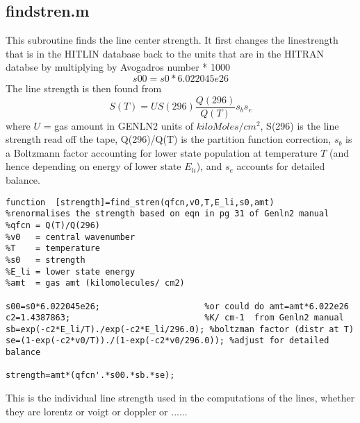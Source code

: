 \documentclass[11pt]{article}
\begin{document}
\subsection{findstren.m}

This subroutine finds the line center strength. It first changes the 
linestrength that is in the HITLIN database back to the units that are
in the HITRAN databse by multiplying by Avogadros number * 1000 
\begin{displaymath}
  s00=s0*6.022045e26
\end{displaymath}
The line strength is then found from 
\begin{displaymath}
S(T) = U S(296) \frac{Q(296)}{Q(T)} s_{b} s_{e}
\end{displaymath}
where $U$ = gas amount in GENLN2 units of $kiloMoles/cm^{2}$, S(296) is the 
line strength read off the tape, Q(296)/Q(T) is the partition function 
correction, $s_{b}$ is a Boltzmann factor accounting for lower state 
population at 
temperature $T$ (and hence depending on energy of lower state $E_{li}$), and
$s_{e}$ accounts for detailed balance.

\begin{verbatim}
function  [strength]=find_stren(qfcn,v0,T,E_li,s0,amt)
%renormalises the strength based on eqn in pg 31 of Genln2 manual
%qfcn = Q(T)/Q(296)
%v0   = central wavenumber
%T    = temperature
%s0   = strength
%E_li = lower state energy
%amt  = gas amt (kilomolecules/ cm2)

s00=s0*6.022045e26;                     %or could do amt=amt*6.022e26
c2=1.4387863;                           %K/ cm-1  from Genln2 manual
sb=exp(-c2*E_li/T)./exp(-c2*E_li/296.0); %boltzman factor (distr at T)
se=(1-exp(-c2*v0/T))./(1-exp(-c2*v0/296.0)); %adjust for detailed balance

strength=amt*(qfcn'.*s00.*sb.*se);
\end{verbatim}

This is the individual line strength used in the computations of the lines,
whether they are lorentz or voigt or doppler or ......



\end{document}
